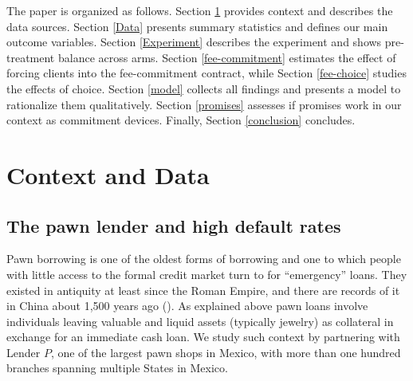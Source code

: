 \documentclass[11pt]{article}
\begin{document}

The paper is organized as follows. Section \ref{context} provides context and describes the data sources. Section \ref{Data} presents summary statistics and defines our main outcome variables. Section \ref{Experiment} describes the experiment and shows pre-treatment balance across arms. Section \ref{fee-commitment} estimates the effect of forcing clients into the fee-commitment contract, while Section \ref{fee-choice} studies the effects of choice. Section \ref{model} collects all findings and presents a model to rationalize them qualitatively. Section \ref{promises} assesses if promises work in our context as commitment devices. Finally, Section \ref{conclusion} concludes.


\section{Context and Data} \label{context}

\subsection{The pawn lender and high default rates}
    
Pawn borrowing is one of the oldest forms of borrowing and one to which people with little access to the formal credit market turn to for ``emergency'' loans. They existed in antiquity at least since the Roman Empire, and there are records of it in China about 1,500 years ago (\cite{PawnShops}). As explained above pawn loans involve individuals leaving valuable and liquid assets (typically jewelry) as collateral in exchange for an immediate cash loan. We study such  context by partnering with Lender $P$, one of the largest pawn shops in Mexico, with more than one hundred branches spanning multiple States in Mexico.
\end{document}
